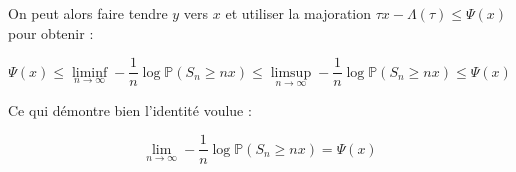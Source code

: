 \documentclass[12pt,titlepage=true]{article}
\renewcommand{\P}{\mathbb{P}}
\begin{document}
		On peut alors faire tendre $y$ vers $x$ et utiliser la majoration $\tau x - \Lambda(\tau) \leqslant \Psi(x) $ pour obtenir : 
		
		\begin{equation*}
			\Psi(x) \leqslant \liminf_{n\rightarrow\infty}-\frac{1}{n} \log \P(S_n \geqslant nx) \leqslant 	\limsup_{n\to\infty}-\frac{1}{n} \log \P(S_n \geqslant nx) \leqslant \Psi(x) 
		\end{equation*}
		
		Ce qui démontre bien l'identité voulue :
		
		\begin{equation}
			\boxed{\lim_{n\to\infty}-\frac{1}{n} \log \P(S_n \geqslant nx) = \Psi(x)} \label{resQ4}
		\end{equation}
	
\end{document}
